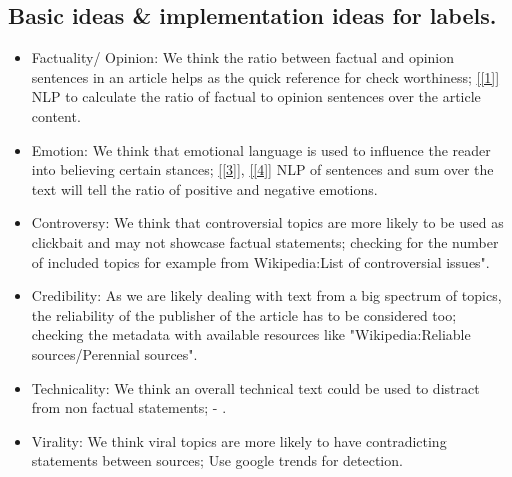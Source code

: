 \documentclass[10pt]{article}
\begin{document}
\subsection{Basic ideas \& implementation ideas for labels.}
\begin{itemize}
\item Factuality/ Opinion: We think the ratio between factual and opinion sentences in an article helps as the quick reference for check worthiness;
\ref{[1]} NLP to calculate the ratio of factual to opinion sentences over the article content.
\item Emotion: We think that emotional language is used to influence the reader into believing certain stances; \ref{[3]}, \ref{[4]} NLP of sentences and sum over the text will tell the ratio of positive and negative emotions.
\item Controversy: We think that controversial topics are more likely to be used as clickbait and may not showcase factual statements; checking for the number of included topics for example from Wikipedia:List of controversial issues".
\item Credibility: As we are likely dealing with text from a big spectrum of topics, the reliability of the publisher of the article has to be considered too; checking the metadata with available resources like  "Wikipedia:Reliable sources/Perennial sources".
\item Technicality: We think an overall technical text could be used to distract from non factual statements; - .
\item Virality: We think viral topics are more likely to have contradicting statements between sources; Use google trends for detection.
\end{itemize}


\end{document}
